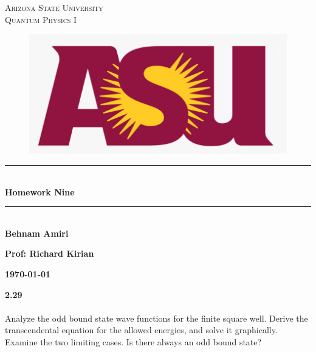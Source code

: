 \documentclass[fleqn]{article}
\begin{document}
  \begin{titlepage}

    \newcommand{\HRule}{\rule{\linewidth}{0.5mm}}

    \center


    \textsc{\LARGE Arizona State University}\\[1.5cm]

    \textsc{\LARGE Quantum Physics I }\\[1.5cm]


    \begin{figure}
      \includegraphics[width=\linewidth]{asu.png}
    \end{figure}


    \HRule \\[0.4cm]
    { \huge \bfseries Homework Nine}\\[0.4cm] 
    \HRule \\[1.5cm]

    \textbf{Behnam Amiri}

    \bigbreak

    \textbf{Prof: Richard Kirian}

    \bigbreak


    \textbf{{\large \today}\\[2cm]}

    \vfill 

  \end{titlepage}
 
  \textbf{2.29} \\ \\
  Analyze the odd bound state wave functions for the finite square well. 
  Derive the transcendental equation for the allowed energies, and solve it
  graphically. Examine the two limiting cases. Is there always an odd bound state?
\end{document}
